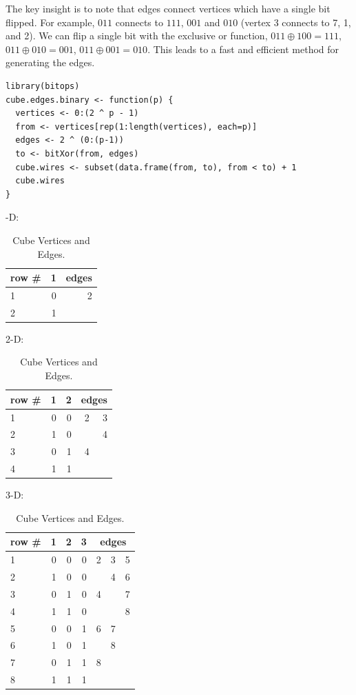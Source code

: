 \documentclass[article]{jss}
\begin{document}
\begin{itemize}
    The key insight is to note that edges connect vertices which have
    a single bit flipped. For example, $011$ connects to $111$, $001$
    and $010$ (vertex 3 connects to 7, 1, and 2). We can flip a single
    bit with the exclusive or function, $011 \oplus 100 = 111$, $011
    \oplus 010 = 001$, $011 \oplus 001 = 010$.  This leads to a fast
    and efficient method for generating the edges.

\begin{verbatim}
library(bitops)
cube.edges.binary <- function(p) {
  vertices <- 0:(2 ^ p - 1)
  from <- vertices[rep(1:length(vertices), each=p)]
  edges <- 2 ^ (0:(p-1))
  to <- bitXor(from, edges)
  cube.wires <- subset(data.frame(from, to), from < to) + 1
  cube.wires
} 
\end{verbatim}

\end{itemize}

\begin{table}[htp]
  -D:
\bigskip

\begin{tabular}{|l ||r|| r|}
\hline
row \# & 1 & edges \\
\hline
1 & 0 & 2\\
\hline
2 & 1 & \\
\hline
\end{tabular}
\bigskip

2-D:
\bigskip

\begin{tabular}{|l ||r|r|| r r|}
\hline
row \# & 1 & 2 & \multicolumn{2}{c|}{edges} \\
\hline
1 & 0 & 0 & 2 & 3\\
\hline
2 & 1 & 0 &  & 4 \\
\hline
3 & 0 & 1 &  4 & \\
\hline
4 & 1 & 1 &  & \\
\hline
\end{tabular}

\bigskip

3-D:
\bigskip

\begin{tabular}{|l ||r|r|r|| r r r|}
\hline
row \# & 1 & 2 & 3 & \multicolumn{3}{c|}{edges} \\
\hline
1 & 0 & 0& 0 & 2 & 3 & 5\\
\hline
2 & 1 & 0 & 0 & & 4 & 6\\
\hline
3 & 0 & 1 & 0 & 4 & & 7\\
\hline
4 & 1 & 1 & 0 & & & 8\\
\hline
5 & 0 & 0 & 1 & 6 & 7 & \\
\hline
6 & 1 & 0 & 1 & & 8 & \\
\hline
7 & 0 & 1 & 1 & 8 & & \\
\hline
8 & 1 & 1 & 1 & & & \\
\hline
\end{tabular}
\caption{Cube Vertices and Edges.}
\label{verticetable}
\end{table}
\end{document}
